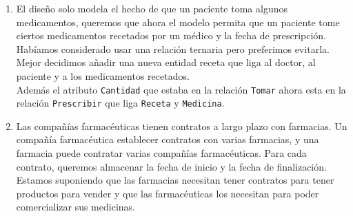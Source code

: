 \documentclass[12pt,a4paper]{article}
\begin{document}
\begin{enumerate}
\begin{enumerate}
			\item El diseño solo modela el hecho de que un paciente toma algunos medicamentos, queremos que ahora el modelo
				permita que un paciente tome ciertos medicamentos recetados por un médico y la fecha de prescripción.\\

				Habíamos considerado usar una relación ternaria pero preferimos evitarla.
				Mejor decidimos añadir una nueva entidad receta que liga al doctor, al paciente y a los medicamentos recetados.\\

				Además el atributo \texttt{Cantidad} que estaba en la relación \texttt{Tomar} ahora esta
				en la relación \texttt{Prescribir} que liga \texttt{Receta} y \texttt{Medicina}.\\

			\item Las compañías farmacéuticas tienen contratos a largo plazo con farmacias. Un compañía farmacéutica establecer
				contratos con varias farmacias, y una farmacia puede contratar varias compañías farmacéuticas. Para cada
				contrato, queremos almacenar la fecha de inicio y la fecha de finalización.\\

				Estamos suponiendo que las farmacias necesitan tener contratos para tener productos para vender y
				que las farmacéuticas los necesitan para poder comercializar sus medicinas.\\

		\end{enumerate}
\end{enumerate}
\end{document}
